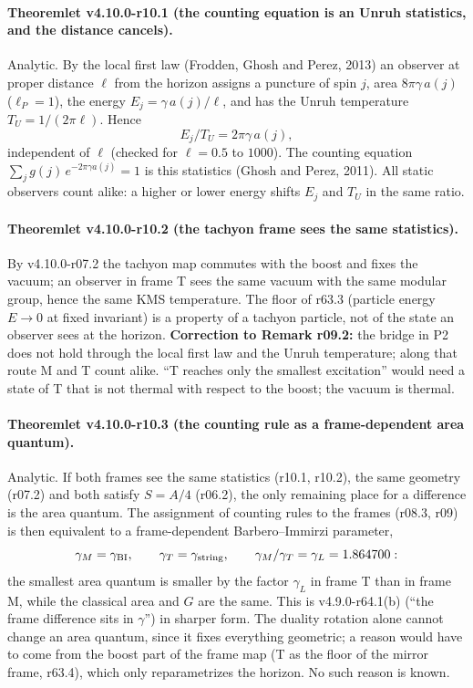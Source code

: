 \paragraph{Theoremlet v4.10.0-r10.1 (the counting equation is an Unruh statistics, and the distance cancels).}
Analytic.  By the local first law (Frodden, Ghosh and Perez, 2013) an observer at proper distance \(\ell\) from the horizon assigns a puncture of spin
\(j\), area \(8\pi\gamma\,a(j)\) (\(\ell_P=1\)), the energy \(E_j=\gamma\,a(j)/\ell\), and has the Unruh temperature \(T_U=1/(2\pi\ell)\).  Hence
\[
E_j/T_U=2\pi\gamma\,a(j),
\]
independent of \(\ell\) (checked for \(\ell=0.5\) to \(1000\)).  The counting equation \(\sum_j g(j)\,e^{-2\pi\gamma a(j)}=1\) is this statistics (Ghosh and
Perez, 2011).  All static observers count alike: a higher or lower energy shifts \(E_j\) and \(T_U\) in the same ratio.

\paragraph{Theoremlet v4.10.0-r10.2 (the tachyon frame sees the same statistics).}
By v4.10.0-r07.2 the tachyon map commutes with the boost and fixes the vacuum; an observer in frame T sees the same vacuum with the same modular group,
hence the same KMS temperature.  The floor of r63.3 (particle energy \(E\to0\) at fixed invariant) is a property of a tachyon particle, not of the state an
observer sees at the horizon.  \textbf{Correction to Remark r09.2:} the bridge in P2 does not hold through the local first law and the Unruh temperature;
along that route M and T count alike.  ``T reaches only the smallest excitation'' would need a state of T that is not thermal with respect to the boost;
the vacuum is thermal.

\paragraph{Theoremlet v4.10.0-r10.3 (the counting rule as a frame-dependent area quantum).}
Analytic.  If both frames see the same statistics (r10.1, r10.2), the same geometry (r07.2) and both satisfy \(S=A/4\) (r06.2), the only remaining place for a
difference is the area quantum.  The assignment of counting rules to the frames (r08.3, r09) is then equivalent to a frame-dependent Barbero--Immirzi
parameter,
\[
\gamma_M=\gamma_{\rm BI},\qquad \gamma_T=\gamma_{\rm string},\qquad \gamma_M/\gamma_T=\gamma_L=1.864700:
\]
the smallest area quantum is smaller by the factor \(\gamma_L\) in frame T than in frame M, while the classical area and \(G\) are the same.  This is
v4.9.0-r64.1(b) (``the frame difference sits in \(\gamma\)'') in sharper form.  The duality rotation alone cannot change an area quantum, since it fixes
everything geometric; a reason would have to come from the boost part of the frame map (T as the floor of the mirror frame, r63.4), which only
reparametrizes the horizon.  No such reason is known.

